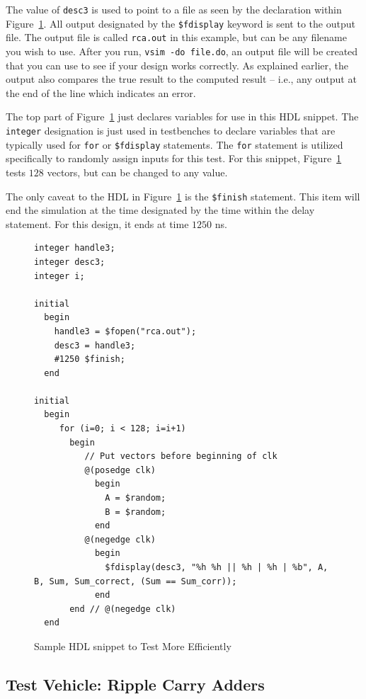 \documentclass{article}
\begin{document}
The value of \verb!desc3! is used to point to a file as seen by the
declaration within Figure~\ref{test.fig}.  All output designated by the
\verb!$fdisplay! keyword is sent to the output file.  The output
file is called \verb!rca.out! in this example, but can be any filename
you wish to use.  After you run, \verb!vsim -do file.do!, an output
file will be created that you can use to see if your design works
correctly.
As explained earlier, the output also compares the
true result to the computed result -- i.e., any output at the end of the
line which indicates an error.

The top part of Figure~\ref{test.fig} just declares variables for use
in this HDL snippet.  The \verb!integer! designation is just used in
testbenches to declare variables that are typically used for
\verb!for! or \verb!$fdisplay! statements.  The \verb!for! statement is
utilized specifically to randomly assign inputs for this test.  For
this snippet, Figure~\ref{test.fig} tests $128$ vectors, but can be
changed to any value.

The only caveat to the HDL in Figure~\ref{test.fig} is the
\verb!$finish! statement.  This item will end the simulation at the
time designated by the time within the delay statement. For this design, it ends at
time $1250$ ns.  
\begin{figure} [b!]
{\small
\begin{verbatim}
integer handle3;
integer desc3;
integer i;

initial
  begin
    handle3 = $fopen("rca.out");
    desc3 = handle3;	
    #1250 $finish;		
  end

initial
  begin
     for (i=0; i < 128; i=i+1)
       begin
          // Put vectors before beginning of clk
          @(posedge clk)
            begin
              A = $random;
              B = $random;
            end
          @(negedge clk)
            begin
     	      $fdisplay(desc3, "%h %h || %h | %h | %b", A, B, Sum, Sum_correct, (Sum == Sum_corr));
            end
       end // @(negedge clk)
  end 
\end{verbatim}
}
\caption{Sample HDL snippet to Test More Efficiently}
\label{test.fig}
\end{figure}


\subsection{Test Vehicle: Ripple Carry Adders}
\end{document}
